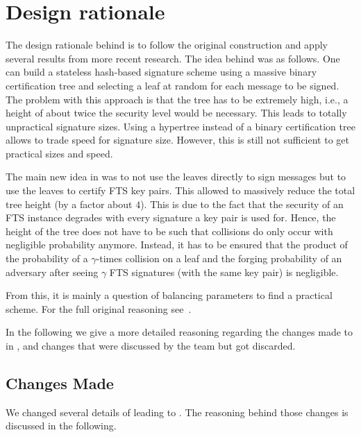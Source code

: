 \section{Design rationale}

The design rationale behind \spx is to follow the original \spc construction
and apply several results from more recent research. The idea behind \spc was
as follows. One can build a
stateless hash-based signature scheme using a massive binary
certification tree and selecting a leaf at random
for each message to be signed. The problem with this approach is that the
tree has to be extremely high, i.e., a height of about twice the security level
would be necessary. This leads to totally unpractical signature sizes. Using a
hypertree instead of a binary certification tree allows to trade speed for
signature size. However, this is still not sufficient to get practical sizes
and speed.

The main new idea in \spc was to not use the leaves directly to
sign messages but to use the leaves to certify FTS key pairs. This allowed to
massively reduce the total tree height (by a factor about $4$). This is due to
the fact that the security of an FTS instance degrades with every signature
a key pair is used for. Hence, the height of the tree does not have to be such
that collisions do only occur with negligible probability anymore. Instead,
it has to be ensured that the product of the probability of a $\gamma$-times
collision on a leaf and the forging probability of an adversary after seeing
$\gamma$ FTS signatures (with the same key pair) is negligible.

From this, it is mainly a question of balancing parameters to find a practical
scheme. For the full original reasoning see~\cite{Bernstein2015}.

In the following we give a more detailed reasoning regarding the changes
made to \spc in \spx, %
and changes that were
discussed by the \spx team but got discarded.

\subsection{Changes Made}
We changed several details of \spc leading to \spx. The reasoning behind those
changes is discussed in the following.
